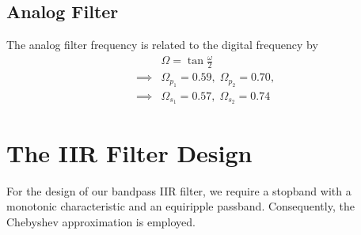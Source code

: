 \documentclass[journal,12pt,twocolumn]{IEEEtran}
\theoremstyle{remark}
\begin{document}
        \subsection{Analog Filter} \label{filt_param}
        The analog filter frequency is related to the digital frequency by 
        \begin{align}
            &\Omega = \tan \frac{\omega}{2} \\
            \implies &\Omega_{p_1} = 0.59,\; \Omega_{p_2} = 0.70,\\ \implies &\Omega_{s_1} = 0.57 ,\; \Omega_{s_2} = 0.74
        \end{align}
    \section{The IIR Filter Design}
    For the design of our bandpass IIR filter, we require a stopband with a monotonic characteristic and an equiripple passband. Consequently, the Chebyshev approximation is employed.
\end{document}
